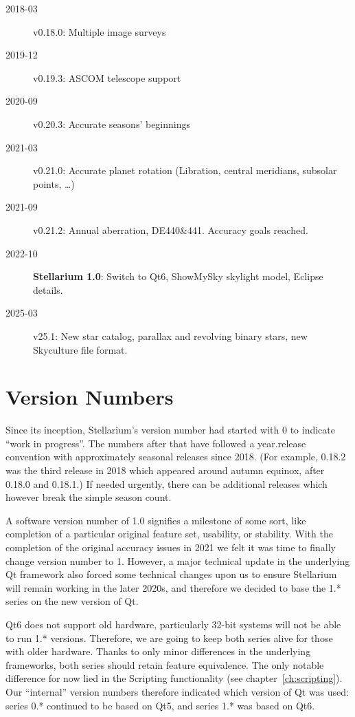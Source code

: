 \begin{description}
\item[2018-03] v0.18.0: Multiple image surveys
\item[2019-12] v0.19.3: ASCOM telescope support 
\item[2020-09] v0.20.3: Accurate seasons' beginnings
\item[2021-03] v0.21.0: Accurate planet rotation (Libration, central meridians, subsolar points, \ldots) 
\item[2021-09] v0.21.2: Annual aberration, DE440\&441. Accuracy goals reached.
\item[2022-10] \textbf{Stellarium 1.0}: Switch to Qt6, ShowMySky skylight model, Eclipse details. 
\item[2025-03] v25.1: New star catalog, parallax and revolving binary stars, new Skyculture file format. 
\end{description}

\section{Version Numbers}
Since its inception, Stellarium's version number had started with 0 to
indicate ``work in progress''. The numbers after that have followed a
year.release convention with approximately seasonal releases since
2018. (For example, 0.18.2 was the third release in 2018 which
appeared around autumn equinox, after 0.18.0 and 0.18.1.) 
If needed urgently, there can be additional releases which however break the simple season count.

A software version number of 1.0 signifies a milestone of some sort,
like completion of a particular original feature set, usability, or
stability. With the completion of the original accuracy issues in 2021
we felt it was time to finally change version number to 1. However, a
major technical update in the underlying Qt framework also forced some
technical changes upon us to ensure Stellarium will remain working in
the later 2020s, and therefore we decided to base the 1.* series on
the new version of Qt.

Qt6 does not support old hardware, particularly 32-bit systems will
not be able to run 1.* versions.  Therefore, we are going to keep both
series alive for those with older hardware. Thanks to only minor
differences in the underlying frameworks, both series should retain
feature equivalence. The only notable difference for now lied in the
Scripting functionality (see chapter~\ref{ch:scripting}).
Our ``internal'' version numbers therefore indicated which version of Qt was used:
series 0.* continued to be based on Qt5, and series 1.* was based on Qt6.

